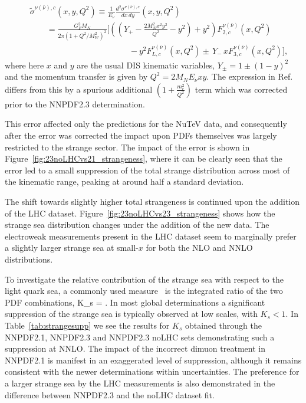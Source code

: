 \begin{eqnarray}
  \label{eq:nuxsecdimuon}
  &&\tilde{\sigma}^{\nu (\bar{\nu}),c}(x,y,Q^2)\equiv 
  \frac{1}{E_{\nu}}\frac{d^2\sigma^{\nu(\bar{\nu}),c}}{dx\,dy}
  (x,y,Q^2)\nonumber\\
  &&\qquad =\frac{G_F^2M_N}{2\pi(1+Q^2/M_W^2)^2}
  \Bigg[ 
    \left( \left( Y_+ - \frac{2M^2_Nx^2y^2}{Q^2} -y^2\right) +y^2\right)
    F_{2,c}^{\nu(\bar{\nu})}(x,Q^2) \nonumber\\ 
    &&\qquad\qquad\qquad\qquad\qquad\qquad
    -y^2F_{L,c}^{\nu(\bar{\nu})}(x,Q^2)\pm 
    \,Y_-\,xF_{3,c}^{\nu(\bar{\nu})}(x,Q^2)
    \Bigg], \,
\end{eqnarray}
where here $x$ and $y$ are the usual DIS kinematic variables, $ Y_\pm = 1\pm(1-y)^2$ and the momentum transfer is given by $Q^2=2M_NE_{\nu}xy$. The expression in Ref.~\cite{Ball:2011mu} differs from this by a spurious additional $\left( 1+ \frac{m_c^2}{Q^2}\right)$ term which was corrected prior to the NNPDF2.3 determination.

This error affected only the predictions for the NuTeV data, and consequently after the error was corrected the impact upon PDFs themselves was largely restricted to the strange sector. The impact of the error is shown in Figure~\ref{fig:23noLHCvs21_strangeness}, where it can be clearly seen that the error led to a small suppression of the total strange distribution across most of the kinematic range, peaking at around half a standard deviation.

The shift towards slightly higher total strangeness is continued upon the addition of the LHC dataset. Figure~\ref{fig:23noLHCvs23_strangeness} shows how the strange sea distribution changes under the addition of the new data. The electroweak measurements present in the LHC dataset seem to marginally prefer a slightly larger strange sea at small-$x$ for both the NLO and NNLO distributions.

To investigate the relative contribution of the strange sea with respect to the light quark sea, a commonly used measure~\cite{Lai:2007dq,Alekhin:2008mb,Martin:2009iq,Ball:2009mk}
 is the integrated ratio of the two PDF combinations,
\be
K_s = .
\ee
In most global determinations a significant suppression of the strange sea is typically observed at low scales, with $K_s < 1$. In Table~\ref{tab:strangesupp} we see the results for $K_s$ obtained through the NNPDF2.1, NNPDF2.3 and NNPDF2.3 noLHC sets demonstrating such a suppression at NNLO. The impact of the incorrect dimuon treatment in NNPDF2.1 is manifest in an exaggerated level of suppression, although it remains consistent with the newer determinations within uncertainties. The preference for a larger strange sea by the LHC measurements is also demonstrated in the difference between NNPDF2.3 and the noLHC dataset fit.


